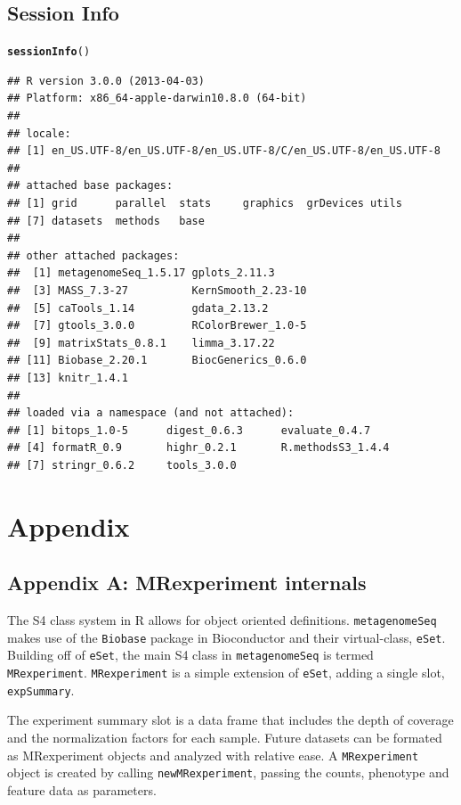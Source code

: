 \documentclass[a4paper,11pt]{article}\usepackage[]{graphicx}\usepackage[]{color}
\makeatletter
\newcommand{\hlstd}[1]{\textcolor[rgb]{0.345,0.345,0.345}{#1}}%
\newcommand{\hlkwd}[1]{\textcolor[rgb]{0.737,0.353,0.396}{\textbf{#1}}}%
\newenvironment{kframe}{%
 \def\at@end@of@kframe{}%
 \ifinner\ifhmode%
  \def\at@end@of@kframe{\end{minipage}}%
  \begin{minipage}{\columnwidth}%
 \fi\fi%
 \def\FrameCommand##1{\hskip\@totalleftmargin \hskip-\fboxsep
 \colorbox{shadecolor}{##1}\hskip-\fboxsep
     \hskip-\linewidth \hskip-\@totalleftmargin \hskip\columnwidth}%
 \MakeFramed {\advance\hsize-\width
   \@totalleftmargin\z@ \linewidth\hsize
   \@setminipage}}%
 {\par\unskip\endMakeFramed%
 \at@end@of@kframe}
\newenvironment{knitrout}{}{} %
\makeatother
\begin{document}
\subsection{Session Info}
\begin{knitrout}
\color{fgcolor}\begin{kframe}
\begin{alltt}
\hlkwd{sessionInfo}\hlstd{()}
\end{alltt}
\begin{verbatim}
## R version 3.0.0 (2013-04-03)
## Platform: x86_64-apple-darwin10.8.0 (64-bit)
## 
## locale:
## [1] en_US.UTF-8/en_US.UTF-8/en_US.UTF-8/C/en_US.UTF-8/en_US.UTF-8
## 
## attached base packages:
## [1] grid      parallel  stats     graphics  grDevices utils    
## [7] datasets  methods   base     
## 
## other attached packages:
##  [1] metagenomeSeq_1.5.17 gplots_2.11.3       
##  [3] MASS_7.3-27          KernSmooth_2.23-10  
##  [5] caTools_1.14         gdata_2.13.2        
##  [7] gtools_3.0.0         RColorBrewer_1.0-5  
##  [9] matrixStats_0.8.1    limma_3.17.22       
## [11] Biobase_2.20.1       BiocGenerics_0.6.0  
## [13] knitr_1.4.1         
## 
## loaded via a namespace (and not attached):
## [1] bitops_1.0-5      digest_0.6.3      evaluate_0.4.7   
## [4] formatR_0.9       highr_0.2.1       R.methodsS3_1.4.4
## [7] stringr_0.6.2     tools_3.0.0
\end{verbatim}
\end{kframe}
\end{knitrout}


\newpage
\section{Appendix}
\subsection{Appendix A: MRexperiment internals}
The S4 class system in R allows for object oriented definitions. \texttt{metagenomeSeq} makes use of the \texttt{Biobase} package in Bioconductor and their virtual-class, \texttt{eSet}. Building off of \texttt{eSet}, the main S4 class in \texttt{metagenomeSeq} is termed \texttt{MRexperiment}. \texttt{MRexperiment} is a simple extension of \texttt{eSet}, adding a single slot, \texttt{expSummary}.

The experiment summary slot is a data frame that includes the depth of coverage and the normalization factors for each sample. Future datasets can be formated as MRexperiment objects and analyzed with relative ease. A \texttt{MRexperiment} object is created by calling \texttt{newMRexperiment}, passing the counts, phenotype and feature data as parameters.
\end{document}

